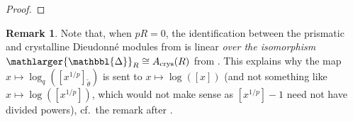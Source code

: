 \documentclass{amsart}
\newcommand{\prism}{{\mathlarger{\mathbbl{\Delta}}}}
\theoremstyle{plain}
\theoremstyle{definition}
\newtheorem{remark}[theorem]{Remark}
\newcommand{\Gm}{{\mathbb{G}_m}}
\newcommand{\Z}{\mathbb{Z}}
\begin{document}
\begin{proof}
\end{proof}

\begin{remark}
  \label{remark-on-identifying-q-log-with-logarithm-in-characteristic-p}
Note that, when $pR=0$, the identification between the prismatic and crystalline Dieudonn\'e modules from  is linear \textit{over the isomorphism $\prism_R\cong A_{\rm crys}(R)$} from . This explains why the map $x\mapsto \log_q([x^{1/p}]_{\tilde{\theta}})$ is sent to $x\mapsto \log([x])$ (and not something like $x\mapsto \log([x^{1/p}])$, which would not make sense as $[x^{1/p}]-1$ need not have divided powers), cf.\ the remark after .
\end{remark}
\end{document}
